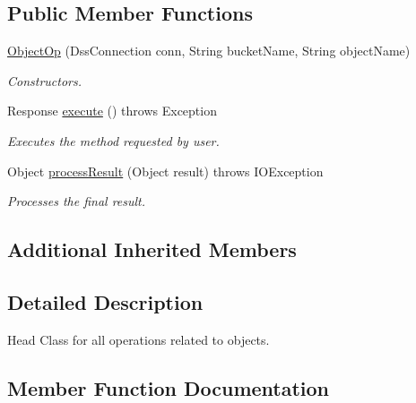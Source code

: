 \subsection*{Public Member Functions}
\begin{DoxyCompactItemize}
\item 
\hyperlink{classorg_1_1jcs_1_1dss_1_1op_1_1ObjectOp_a55f2bd7945ff68e1915eb6d9ea59ebd4}{Object\+Op} (Dss\+Connection conn, String bucket\+Name, String object\+Name)\hypertarget{classorg_1_1jcs_1_1dss_1_1op_1_1ObjectOp_a55f2bd7945ff68e1915eb6d9ea59ebd4}{}\label{classorg_1_1jcs_1_1dss_1_1op_1_1ObjectOp_a55f2bd7945ff68e1915eb6d9ea59ebd4}

\begin{DoxyCompactList}\small\item\em Constructors. \end{DoxyCompactList}\item 
Response \hyperlink{classorg_1_1jcs_1_1dss_1_1op_1_1ObjectOp_aefe80e395c9cb318f1a052e85362a520}{execute} ()  throws Exception 
\begin{DoxyCompactList}\small\item\em Executes the method requested by user. \end{DoxyCompactList}\item 
Object \hyperlink{classorg_1_1jcs_1_1dss_1_1op_1_1ObjectOp_a8d3b1fe1a3888deaa06e9f28e820d042}{process\+Result} (Object result)  throws I\+O\+Exception\hypertarget{classorg_1_1jcs_1_1dss_1_1op_1_1ObjectOp_a8d3b1fe1a3888deaa06e9f28e820d042}{}\label{classorg_1_1jcs_1_1dss_1_1op_1_1ObjectOp_a8d3b1fe1a3888deaa06e9f28e820d042}

\begin{DoxyCompactList}\small\item\em Processes the final result. \end{DoxyCompactList}\end{DoxyCompactItemize}
\subsection*{Additional Inherited Members}


\subsection{Detailed Description}
Head Class for all operations related to objects. 

\subsection{Member Function Documentation}
